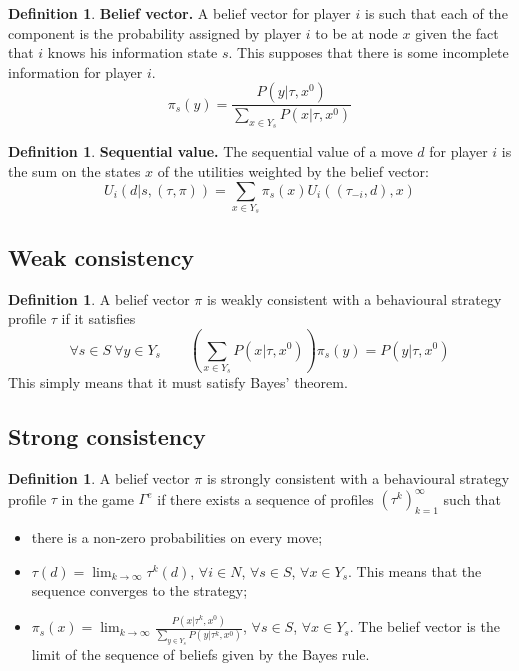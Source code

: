 \documentclass[12pt, openany]{report}
\theoremstyle{definition}
\newtheorem{definition}[thm]{Definition}
\begin{document}
\begin{definition}\textbf{Belief vector.}
	A belief vector for player $i$ is such that each of the component is the probability assigned by player $i$ to be at node $x$ given the fact that $i$ knows his information state $s$. This supposes that there is some incomplete information for player $i$.
	\begin{equation}
		\pi_s(y) = \frac{P(y|\tau,x^0)}{\sum_{x\in Y_s}P(x|\tau,x^0)}
	\end{equation}
\end{definition}
\begin{definition}\textbf{Sequential value.}
	The sequential value of a move $d$ for player $i$ is the sum on the states $x$ of the utilities weighted by the belief vector:
	\begin{equation}
		U_i(d|s,(\tau,\pi)) = \sum_{x\in Y_s} \pi_s(x)U_i((\tau_{-i},d),x)
	\end{equation}
\end{definition}
\subsection{Weak consistency}
\begin{definition}
	A belief vector $\pi$ is weakly consistent with a behavioural strategy profile $\tau$ if it satisfies 
	\begin{equation}
		\forall s\in S \ \forall y\in Y_s \qquad \left(\sum_{x\in Y_s} P(x|\tau,x^0)\right)\pi_s(y) = P(y|\tau,x^0)
	\end{equation}
	This simply means that it must satisfy Bayes' theorem. 
\end{definition}
\subsection{Strong consistency}
\begin{definition}
	A belief vector $\pi$ is strongly consistent with a behavioural strategy profile $\tau$ in the game $\Gamma^e$ if there exists a sequence of profiles $(\tau^k)_{k=1}^\infty$ such that
	\begin{itemize}
		\item there is a non-zero probabilities on every move;
		\item $\tau(d)=\lim_{k\to \infty}\tau^k(d)$, $\forall i \in N$, $\forall s \in S$, $\forall x \in Y_s$. This means that the sequence converges to the strategy;
		\item $\pi_s(x) = \lim_{k\to \infty} \frac{P(x|\tau^k,x^0)}{\sum_{y\in Y_s}P(y|\tau^k,x^0)}$, $\forall s \in S$, $\forall x\in Y_s$. The belief vector is the limit of the sequence of beliefs given by the Bayes rule. 
	\end{itemize}
\end{definition}
\end{document}
